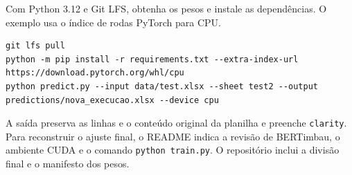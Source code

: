 \documentclass[11pt,a4paper]{article}
\begin{document}
Com Python 3.12 e Git LFS, obtenha os pesos e instale as dependências. O exemplo usa o índice de rodas PyTorch para CPU.

\begin{lstlisting}
git lfs pull
python -m pip install -r requirements.txt --extra-index-url https://download.pytorch.org/whl/cpu
python predict.py --input data/test.xlsx --sheet test2 --output predictions/nova_execucao.xlsx --device cpu
\end{lstlisting}

A saída preserva as linhas e o conteúdo original da planilha e preenche \nolinkurl{clarity}. Para reconstruir o ajuste final, o README indica a revisão de BERTimbau, o ambiente CUDA e o comando \nolinkurl{python train.py}. O repositório inclui a divisão final e o manifesto dos pesos.
\end{document}
